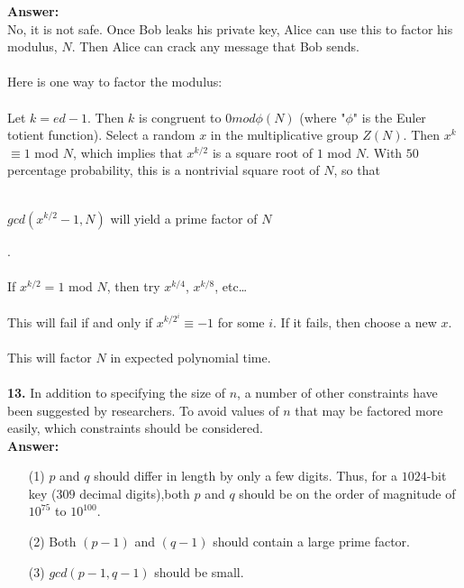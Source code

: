 \documentclass[paper=a4, fontsize=11pt]{scrartcl} %
\numberwithin{equation}{section} %
\numberwithin{figure}{section} %
\numberwithin{table}{section} %
\begin{document}
 \textbf{Answer:}\\

 No, it is not safe. Once Bob leaks his private key, Alice can use this to factor his modulus, $N$. Then Alice can crack any message that Bob sends.\\
 \\
 Here is one way to factor the modulus:\\
 \\
 Let $k=ed-1$. Then $k$ is congruent to $0 mod \phi(N)$ (where "$\phi$" is the Euler totient function). Select a random $x$ in the multiplicative group $Z(N)$. Then $x^{k}$ $\equiv 1$ mod $N$, which implies that $x^{k/2}$ is a square root of $1$ mod $N$. With $50$ percentage probability, this is a nontrivial square root of $N$, so that\\
  \\
  \centerline{$gcd(x^{k/2}-1, N)$ \hspace{0.2cm} will yield a prime factor of $N$}. \\
  \\
  If $x^{k/2} = 1$ mod $N$, then try $x^{k/4}$, $x^{k/8}$, etc\ldots \\
  \\
  This will fail if and only if  $x^{k/2^{i}} \equiv-1$ for some $i$. If it fails, then choose a new $x$. \\
  \\
  This will factor $N$ in expected polynomial time.\\\\



 \textbf{13.} In addition to specifying the size of $n$, a number of other constraints have been suggested by researchers. To avoid values of $n$ that may be factored more easily, which constraints should be considered.\\

 \textbf{Answer:}

 \begin{enumerate}
  \item[(1)] $p$ and $q$ should differ in length by only a few digits. Thus, for a $1024$-bit key ($309$ decimal digits),both $p$ and $q$ should be on the order of magnitude of $10^{75}$ to $10^{100}$.
  \item[(2)] Both $(p - 1)$ and $(q - 1)$ should contain a large prime factor.
  \item[(3)] $gcd(p - 1,q - 1)$ should be small.\\
 \end{enumerate}
\end{document}

